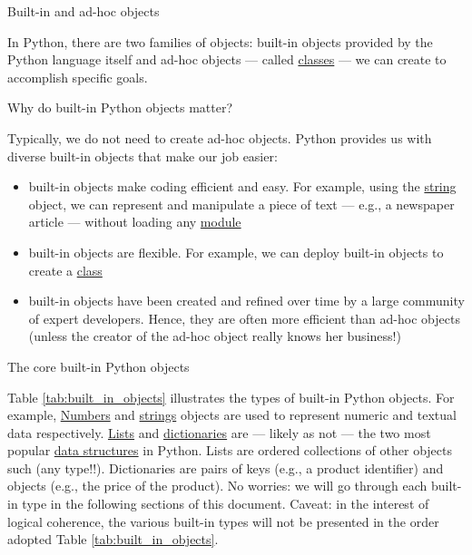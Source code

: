 \documentclass[a4paper,11pt]{book}
\newcommand{\question}[1]{%
    \begin{tcolorbox}[colback=comp_c!10,colframe=comp_c,sidebyside align=top,width=\linewidth,before skip=1ex]
        #1
    \end{tcolorbox}%
    \switchcolumn%
}
\newcommand{\note}[1]{%
    \begin{tcolorbox}[colback=white!0,colframe=white!10,width=\linewidth,before skip=1ex]
        #1
    \end{tcolorbox}         
}
\begin{document}
\begin{paracol}{2}
    \question{\raggedright Built-in and ad-hoc objects}
    \note{In Python, there are two families of objects: built-in objects provided by the Python language itself and ad-hoc objects --- called \href{https://docs.python.org/3/tutorial/classes.html}{classes} --- we can create to accomplish specific goals.}
\end{paracol}

\begin{paracol}{2}
    \question{\raggedright Why do built-in Python objects matter?} 
    \note{
    Typically, we do not need to create ad-hoc objects. Python provides us with diverse built-in objects that make our job easier:
    \begin{itemize}
    	\item built-in objects make coding efficient and easy. For example, using the \href{https://docs.python.org/3/tutorial/introduction.html#strings}{string} object, we can represent and manipulate a piece of text --- e.g., a newspaper article --- without loading any \href{https://docs.python.org/3/tutorial/modules.html}{module}
    	\item built-in objects are flexible. For example, we can deploy built-in objects to create a \href{https://docs.python.org/3/tutorial/classes.html}{class}
    	\item built-in objects have been created and refined over time by a large community of expert developers. Hence, they are  often  more  efficient  than  ad-hoc objects (unless the creator of the ad-hoc object really knows her business!)
    \end{itemize}}
\end{paracol}
\clearpage

\begin{paracol}{2}
    \question{\raggedright The core built-in Python objects} 
	\note{Table \ref{tab:built_in_objects} illustrates the types of built-in Python objects. For example, \href{https://docs.python.org/3/tutorial/introduction.html#numbers}{Numbers} and \href{https://docs.python.org/3/tutorial/introduction.html#strings}{strings} objects are used to represent numeric and textual data respectively. \href{https://docs.python.org/3/tutorial/introduction.html#lists}{Lists} and \href{https://docs.python.org/3/tutorial/datastructures.html#dictionaries}{dictionaries} are --- likely as not --- the two most popular \href{https://docs.python.org/3/tutorial/datastructures.html}{data structures} in Python. Lists are ordered collections of other objects such (any type!!). Dictionaries are pairs of keys (e.g., a product identifier) and objects (e.g., the price of the product). No worries: we will go through each built-in type in the following sections of this document. Caveat: in the interest of logical coherence, the various built-in types will not be presented in the order adopted Table \ref{tab:built_in_objects}.} 
\end{paracol}
\end{document}
